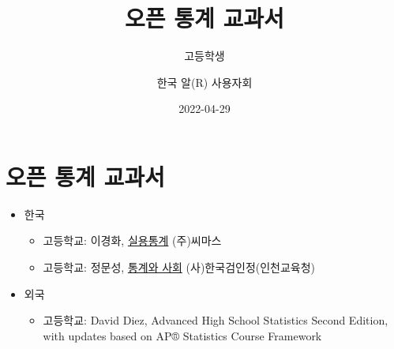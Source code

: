 \documentclass[
]{book}
\title{오픈 통계 교과서}
\subtitle{고등학생}
\author{한국 알(R) 사용자회}
\date{2022-04-29}
\providecommand{\tightlist}{%
  \setlength{\itemsep}{0pt}\setlength{\parskip}{0pt}}
\begin{document}
\maketitle

{
\setcounter{tocdepth}{1}
\tableofcontents
}
\hypertarget{uxc624uxd508-uxd1b5uxacc4-uxad50uxacfcuxc11c}{%
\chapter{오픈 통계 교과서}\label{uxc624uxd508-uxd1b5uxacc4-uxad50uxacfcuxc11c}}

\begin{itemize}
\tightlist
\item
  한국

  \begin{itemize}
  \tightlist
  \item
    고등학교: 이경화, \href{https://www.ktbookmall.com/user/shop/01_normal/list.do?cat=13\&code=76214}{실용통계} (주)씨마스 \citep{lee2020textbook}
  \item
    고등학교: 정문성, \href{https://www.ktbookmall.com/user/shop/01_normal/list.do?cat=13\&code=17477}{통계와 사회} (사)한국검인정(인천교육청) \citep{jung2021textbook}
  \end{itemize}
\item
  외국

  \begin{itemize}
  \tightlist
  \item
    고등학교: David Diez, Advanced High School Statistics Second Edition, with updates based on AP® Statistics Course Framework \citep{barr2019advanced}
  \end{itemize}
\end{itemize}

  
\end{document}
